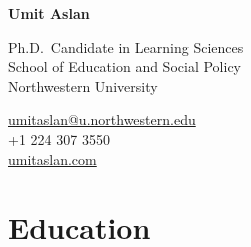 \documentclass[11pt,letterpaper]{report} %
\newcommand{\myname}{Umit Aslan}
\newcommand{\namefont}[1]{{\normalfont\bfseries\Huge{#1}}}
\begin{document}
    \raggedright{}

    \namefont{\myname}

    \vspace{1em}
    \begin{minipage}[t]{0.700\textwidth}
        Ph.D.\ Candidate in Learning Sciences \\
        School of Education and Social Policy \\
        Northwestern University
    \end{minipage}
    \begin{minipage}[t]{0.295\textwidth}
        \raggedleft{}
        \href{mailto:umitaslan@u.northwestern.edu}{umitaslan@u.northwestern.edu} \\
        +1 224 307 3550 \\
        \href{https://umitaslan.com}{umitaslan.com}
    \end{minipage}


    \section*{Education}
\end{document}
